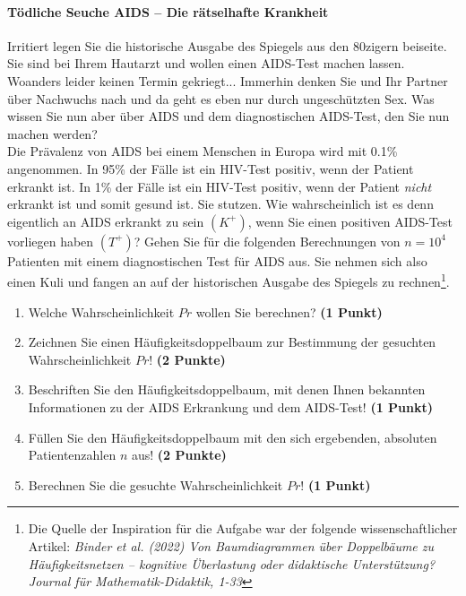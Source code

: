 \documentclass[a4paper, 9pt]{scrartcl}\usepackage[]{graphicx}\usepackage[]{xcolor}
\begin{document}
\paragraph{T{\"o}dliche Seuche AIDS -- Die r{\"a}tselhafte Krankheit}




Irritiert legen Sie die historische Ausgabe des Spiegels aus den 80zigern
beiseite. Sie sind bei Ihrem Hautarzt und wollen einen AIDS-Test machen
lassen. Woanders leider keinen Termin gekriegt... Immerhin denken Sie und
Ihr Partner {\"u}ber Nachwuchs nach und da geht es eben nur durch
ungesch{\"u}tzten Sex. Was wissen Sie nun aber {\"u}ber AIDS und dem diagnostischen
AIDS-Test, den Sie nun machen werden?\\

Die Pr{\"a}valenz von AIDS bei einem Menschen in Europa wird mit
0.1\% angenommen. In 95\% der F{\"a}lle ist ein
HIV-Test positiv, wenn der Patient erkrankt ist. In 1\%
der F{\"a}lle ist ein HIV-Test positiv, wenn der Patient \textit{nicht}
erkrankt ist und somit gesund ist. Sie stutzen. Wie wahrscheinlich ist es
denn eigentlich an AIDS erkrankt zu sein $(K^+)$, wenn Sie einen positiven
AIDS-Test vorliegen haben $(T^+)$? Gehen Sie f{\"u}r die folgenden Berechnungen
von $n = \ensuremath{10^{4}}$ Patienten mit einem diagnostischen Test f{\"u}r AIDS
aus. Sie nehmen sich also einen Kuli und fangen an auf der historischen
Ausgabe des Spiegels zu rechnen\footnote{Die Quelle der Inspiration f{\"u}r die
  Aufgabe war der folgende wissenschaftlicher Artikel: \textit{Binder et
    al. (2022) Von Baumdiagrammen {\"u}ber Doppelb{\"a}ume zu H{\"a}ufigkeitsnetzen --
    kognitive {\"U}berlastung oder didaktische Unterst{\"u}tzung? Journal f{\"u}r
    Mathematik-Didaktik, 1-33}}.

\begin{enumerate}
\item Welche Wahrscheinlichkeit $Pr$ wollen Sie berechnen? \textbf{(1 Punkt)}
\item Zeichnen Sie einen H{\"a}ufigkeitsdoppelbaum zur Bestimmung der gesuchten
  Wahrscheinlichkeit $Pr$! \textbf{(2 Punkte)} 
\item Beschriften Sie den H{\"a}ufigkeitsdoppelbaum, mit denen Ihnen bekannten
  Informationen zu der AIDS Erkrankung und dem AIDS-Test! \textbf{(1 Punkt)}
\item F{\"u}llen Sie den H{\"a}ufigkeitsdoppelbaum mit den sich ergebenden,
  absoluten Patientenzahlen $n$ aus! \textbf{(2 Punkte)}
\item Berechnen Sie die gesuchte Wahrscheinlichkeit $Pr$! \textbf{(1 Punkt)}
\end{enumerate}
\end{document}
